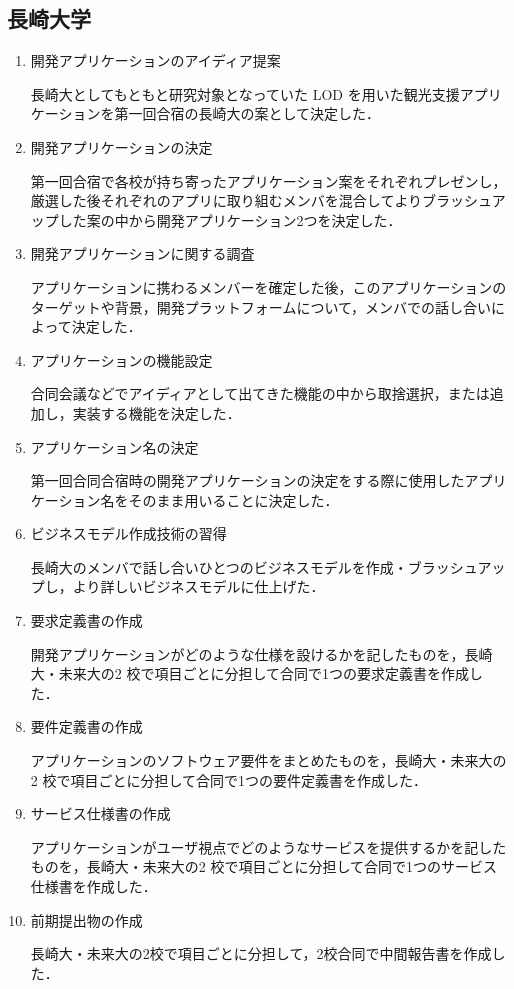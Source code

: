 \subsection{長崎大学}
\begin{enumerate}
\item 開発アプリケーションのアイディア提案 
\par 長崎大としてもともと研究対象となっていた LOD を用いた観光支援アプリケーションを第一回合宿の長崎大の案として決定した．
\item 開発アプリケーションの決定 
\par 第一回合宿で各校が持ち寄ったアプリケーション案をそれぞれプレゼンし，厳選した後それぞれのアプリに取り組むメンバを混合してよりブラッシュアップした案の中から開発アプリケーション2つを決定した． 
\item 開発アプリケーションに関する調査 
\par  アプリケーションに携わるメンバーを確定した後，このアプリケーションのターゲットや背景，開発プラットフォームについて，メンバでの話し合いによって決定した．
\item アプリケーションの機能設定 
\par 合同会議などでアイディアとして出てきた機能の中から取捨選択，または追加し，実装する機能を決定した． 
\item アプリケーション名の決定 
\par 第一回合同合宿時の開発アプリケーションの決定をする際に使用したアプリケーション名をそのまま用いることに決定した．
\item ビジネスモデル作成技術の習得 
\par 長崎大のメンバで話し合いひとつのビジネスモデルを作成・ブラッシュアップし，より詳しいビジネスモデルに仕上げた．
\item 要求定義書の作成 
\par 開発アプリケーションがどのような仕様を設けるかを記したものを，長崎大・未来大の2 校で項目ごとに分担して合同で1つの要求定義書を作成した． 
\item 要件定義書の作成 
\par アプリケーションのソフトウェア要件をまとめたものを，長崎大・未来大の2 校で項目ごとに分担して合同で1つの要件定義書を作成した． 
\item サービス仕様書の作成 
\par アプリケーションがユーザ視点でどのようなサービスを提供するかを記したものを，長崎大・未来大の2 校で項目ごとに分担して合同で1つのサービス仕様書を作成した．
\item 前期提出物の作成 
\par 長崎大・未来大の2校で項目ごとに分担して，2校合同で中間報告書を作成した．
\end{enumerate}

